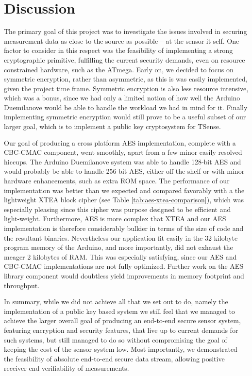 
\chapter{Discussion}
\label{sec:discussion}

The primary goal of this project was to investigate the issues involved in securing measurement data as close to the source as possible -- at the sensor it self. One factor to consider in this respect was the feasibility of implementing a strong cryptographic primitive, fulfilling the current security demands, even on resource constrained hardware, such as the ATmega.
%
Early on, we decided to focus on symmetric encryption, rather than asymmetric, as this is was easily implemented, given the project time frame. Symmetric encryption is also less resource intensive, which was a bonus, since we had only a limited notion of how well the Arduino Duemilanove would be able to handle the workload we had in mind for it. Finally implementing symmetric encryption would still prove to be a useful subset of our larger goal, which is to implement a public key cryptosystem for TSense.

Our goal of producing a cross platform AES implementation, complete with a CBC-CMAC component, went smoothly, apart from a few minor easily resolved hiccups. The Arduino Duemilanove system was able to handle 128-bit AES and would probably be able to handle 256-bit AES, either off the shelf or with minor hardware enhancements, such as extra ROM space. 
%
The performance of our implementation was better than we expected and compared favorably with a the lightweight XTEA block cipher (see Table \ref{tab:aes-xtea-comparison}), which was especially pleasing since this cipher was purpose designed to be efficient and light-weight. Furthermore, AES is more complex that XTEA and our AES implementation is therefore considerably bulkier in terms of the size of code and the resultant binaries. Nevertheless our application fit easily in the 32 kilobyte program memory of the Arduino, and more importantly, did not exhaust the meager 2 kilobytes of RAM. This was especially satisfying, since our AES and CBC-CMAC implementations are not fully optimized. Further work on the AES library component would doubtless yield improvements in memory footprint and throughput. 

In summary, while we did not achieve all that we set out to do, namely the implementation of a public key based system we still feel that we managed to achieve the larger overall goal of producing an end-to-end secure sensor system, featuring encryption and security features, that live up to current demands for such systems, but still managed to do so without compromising the goal of keeping the cost of the sensor system low. Most importantly, we demonstrated the feasibility of absolute end-to-end secure data stream, allowing positive receiver end verifiability of measurements.

